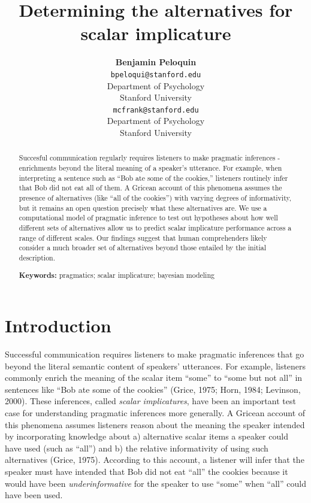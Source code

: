 \documentclass[10pt, letterpaper]{article}
\title{Determining the alternatives for scalar implicature}
\author{{\large \bf Benjamin Peloquin} \\ \texttt{bpeloqui@stanford.edu} \\ Department of Psychology \\ Stanford University \And {\large \bf Michael C. Frank} \\ \texttt{mcfrank@stanford.edu} \\ Department of Psychology \\ Stanford University}
\begin{document}
\maketitle

\begin{abstract}
Succesful communication regularly requires listeners to make pragmatic
inferences - enrichments beyond the literal meaning of a speaker's
utterance. For example, when interpreting a sentence such as ``Bob ate
some of the cookies,'' listeners routinely infer that Bob did not eat
all of them. A Gricean account of this phenomena assumes the presence of
alternatives (like ``all of the cookies'') with varying degrees of
informativity, but it remains an open question precisely what these
alternatives are. We use a computational model of pragmatic inference to
test out hypotheses about how well different sets of alternatives allow
us to predict scalar implicature performance across a range of different
scales. Our findings suggest that human comprehenders likely consider a
much broader set of alternatives beyond those entailed by the initial
description.

\textbf{Keywords:}
pragmatics; scalar implicature; bayesian modeling
\end{abstract}

\section{Introduction}\label{introduction}

Successful communication requires listeners to make pragmatic inferences
that go beyond the literal semantic content of speakers' utterances. For
example, listeners commonly enrich the meaning of the scalar item
``some'' to ``some but not all'' in sentences like ``Bob ate some of the
cookies'' (Grice, 1975; Horn, 1984; Levinson, 2000). These inferences,
called \emph{scalar implicatures}, have been an important test case for
understanding pragmatic inferences more generally. A Gricean account of
this phenomena assumes listeners reason about the meaning the speaker
intended by incorporating knowledge about a) alternative scalar items a
speaker could have used (such as ``all'') and b) the relative
informativity of using such alternatives (Grice, 1975). According to
this account, a listener will infer that the speaker must have intended
that Bob did not eat ``all'' the cookies because it would have been
\emph{underinformative} for the speaker to use ``some'' when ``all''
could have been used.
\end{document}
